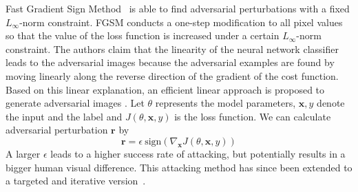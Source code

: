Fast Gradient Sign Method~\cite{DBLP:journals/corr/GoodfellowSS14} is able to find adversarial perturbations 
with a fixed $L_{\infty}$-norm constraint. FGSM conducts 
a one-step modification to all pixel values so that the value of the loss function is increased under a certain $L_{\infty}$-norm constraint. 
%
The authors claim that the linearity of the neural network classifier leads to the adversarial images because the adversarial examples are found by moving linearly along the reverse direction of the gradient of the cost function. 
%
%
Based on this linear explanation, an efficient linear approach is proposed to generate adversarial images \cite{DBLP:journals/corr/GoodfellowSS14}. Let $\theta$ represents the model parameters, $\textbf{x},y$ denote the input and the label and $J(\theta, \textbf{x}, y)$ is the loss function. We can calculate adversarial perturbation $\textbf{r}$ by
\begin{equation}
    \textbf{r} = \epsilon\ \text{sign}\left(\nabla_{\textbf{x}} J(\theta, \textbf{x}, y)\right)
\end{equation}
A larger $\epsilon$ leads to a higher success rate of attacking, but potentially results in a bigger human visual difference. This attacking method has since been extended to a targeted and iterative version~\cite{KGB2016}.


